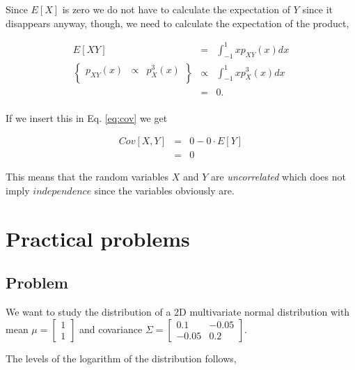 \documentclass{article}
\begin{document}
Since $E[X]$ is zero we do not have to calculate the expectation of $Y$ since it disappears anyway, though, we need to calculate the expectation of the product,

\begin{equation}
	\begin{array}{rcl}
		E[XY]	& =			& \displaystyle\int_{-1}^{1}xp_{XY}(x)dx\\
		\left\{
			\begin{array}{rcl}
				p_{XY}(x) & \propto	& p_X^3(x) \\
			\end{array}
		\right\}	& \propto	& \displaystyle\int_{-1}^{1}xp_X^3(x)dx \\
				& = 		& 0. \\
	\end{array}
\end{equation}

If we insert this in Eq. \eqref{eq:cov} we get 

\begin{equation}
	\begin{array}{rcl}
		Cov[X,Y]	& =	& 0-0\cdot E[Y]\\
					& =	& 0
	\end{array}
\end{equation}

This means that the random variables $X$ and $Y$ are \textit{uncorrelated} which does not imply $independence$ since the variables obviously are.

\newpage 
\section{Practical problems}

\subsection{Problem} %

We want to study the distribution of a 2D multivariate normal distribution with mean $\mu=\left[\begin{array}{rr} 1 \\ 1
\end{array}\right]$ and covariance $\Sigma = \left[\begin{array}{rr} 0.1 &-0.05  \\ -0.05 & 0.2\end{array}\right]$.

The levels of the logarithm of the distribution follows,
\end{document}
